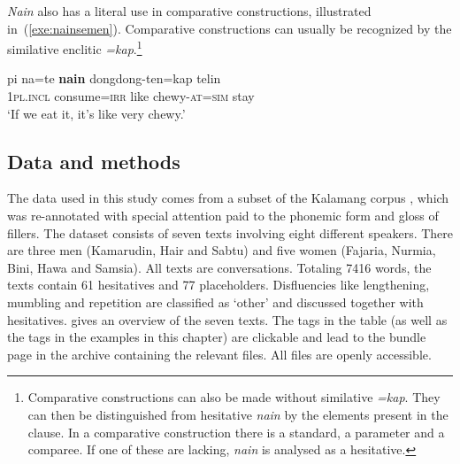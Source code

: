\documentclass[output=paper,colorlinks,citecolor=brown
\ChapterDOI{10.5281/zenodo.15697587}
]{langscibook}
\begin{document}
\textit{Nain} also has a literal use in comparative constructions, illustrated in~(\ref{exe:nainsemen}). Comparative constructions can usually be recognized by the similative enclitic \textit{=kap}.\footnote{Comparative constructions can also be made without similative \textit{=kap}. They can then be distinguished from hesitative \textit{nain} by the elements present in the clause. In a comparative construction there is a standard, a parameter and a comparee. If one of these are lacking, \textit{nain} is analysed as a hesitative.}

\begin{exe}
	\ex \gll pi na=te \textbf{nain} dongdong-ten=kap telin\\
	\textsc{1pl.incl} consume=\textsc{irr} like chewy-\textsc{at=sim} stay\\
	\glt `If we eat it, it's like very chewy.' 
	\label{exe:nainsemen}
\end{exe}



\subsection{Data and methods}
\label{sec:data}
The data used in this study comes from a subset of the Kalamang corpus \citep{vissercorpus}, which was re-annotated with special attention paid to the phonemic form and gloss of fillers. The dataset consists of seven texts involving eight different speakers. There are three men (Kamarudin, Hair and Sabtu) and five women (Fajaria, Nurmia, Bini, Hawa and Samsia). All texts are conversations. Totaling 7416 words, the texts contain 61 hesitatives and 77 placeholders. Disfluencies like lengthening, mumbling and repetition are classified as `other' and discussed together with hesitatives.  gives an overview of the seven texts. The tags in the table (as well as the tags in the examples in this chapter) are clickable and lead to the bundle page in the archive containing the relevant files. All files are openly accessible.
\end{document}
